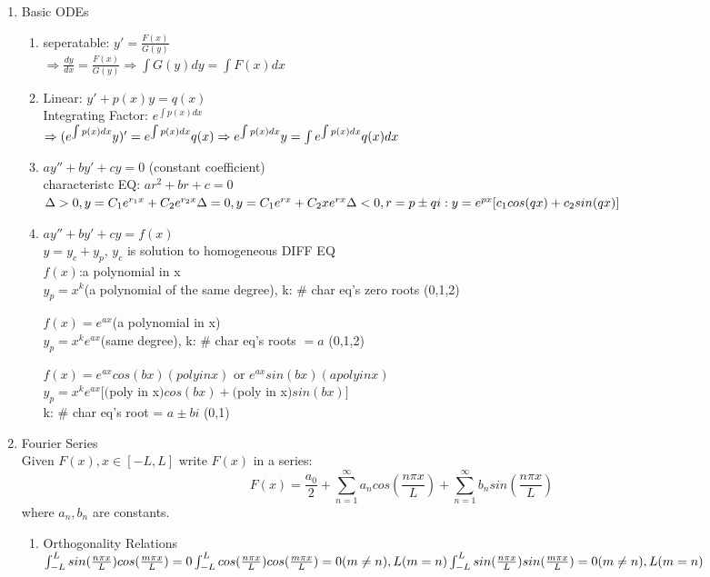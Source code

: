\documentclass[10pt]{article}
\begin{document}
  
\begin{multicols}{2}
	
\begin{enumerate}
	\item Basic ODEs
	\begin{enumerate}
		\item seperatable: $y'= \frac{F(x)}{G(y)}$\\
		$\Rightarrow \frac{dy}{dx} = \frac{F(x)}{G(y)} \Rightarrow \int G(y)dy = \int F(x)dx$
		
		\item Linear: $y'+p(x)y = q(x)$\\
		Integrating Factor: $e^{\int p(x)dx}$\\
		$\Rightarrow (e^{\int p(x)dx}y)' = e^{\int p(x)dx}q(x)\\ \Rightarrow
		e^{\int p(x)dx}y = \int e^{\int p(x)dx}q(x)dx$
		
		\item $ay'' + by' + cy = 0$ (constant coefficient)\\
		characteristc EQ: $ar^2 + br + c = 0$\\
		$\Delta > 0, y = C_1e^{r_1x} + C_2e^{r_2x}\\
		\Delta = 0, y = C_1e^{rx} + C_2xe^{rx}\\
		\Delta < 0, r = p \pm qi: y = e^{px}[c_1cos(qx)+c_2sin(qx)]$
		
		\item $ay'' + by' + cy = f(x)$ \\
		$y = y_c + y_p$, $y_c$ is solution to homogeneous DIFF EQ\\
		$f(x)$:a polynomial in x\\
		$y_p =  x^k$(a polynomial of the same degree), k: $\#$ char eq's zero roots (0,1,2)
		
		$f(x) = e^{ax}$(a polynomial in x)\\
		$y_p =  x^ke^{ax}$(same degree), k: $\#$ char eq's roots $= a$ (0,1,2)
		
		$f(x) = e^{ax}cos(bx)(poly in x)$ or $e^{ax}sin(bx)(a poly in x)$\\
		$y_p = x^ke^{ax} [ ($poly in x$)cos(bx) + ($poly in x$)sin(bx) ]$\\
		k: $\#$ char eq's root = $a \pm bi$ (0,1)
	\end{enumerate}

	\item Fourier Series\\
	Given $F(x), x\in [-L,L]$ write $F(x)$ in a series:
	$$F(x) = \frac{a_0}{2} + \sum_{n = 1}^{\infty}a_n cos(\frac{n\pi x}{L}) + \sum_{n = 1}^{\infty}b_n sin(\frac{n\pi x}{L})$$ where $a_n, b_n$ are constants.
	\begin{enumerate}
		\item  Orthogonality Relations\\
		$\int_{-L}^{L}sin(\frac{n\pi x}{L})cos(\frac{m\pi x}{L}) = 0\\
		\int_{-L}^{L}cos(\frac{n\pi x}{L})cos(\frac{m\pi x}{L}) = 0(m \neq n), L(m = n)\\
		\int_{-L}^{L}sin(\frac{n\pi x}{L})sin(\frac{m\pi x}{L}) = 0(m \neq n), L(m = n)$
		

\end{enumerate}
\end{enumerate}
\end{multicols}
\end{document}
